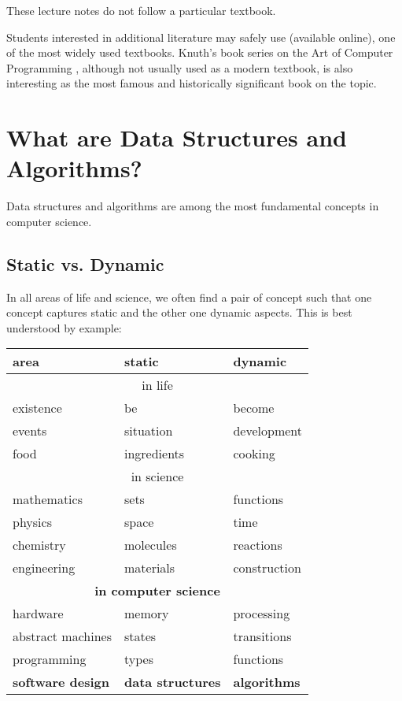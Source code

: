 These lecture notes do not follow a particular textbook.

Students interested in additional literature may safely use \cite{cormen_algorithms} (available online), one of the most widely used textbooks.
Knuth's book series on the Art of Computer Programming \cite{knuth_art}, although not usually used as a modern textbook, is also interesting as the most famous and historically significant book on the topic.

\section{What are Data Structures and Algorithms?}\label{sec:ad:whatare}

Data structures and algorithms are among the most fundamental concepts in computer science.

\subsection{Static vs. Dynamic}\label{sec:ad:static}

In all areas of life and science, we often find a pair of concept such that one concept captures static and the other one dynamic aspects.
This is best understood by example:

\begin{center}
\begin{tabular}{|l||l|l|}
\hline
area & static & dynamic \\
\hline
\hline
\multicolumn{3}{|c|}{in life}\\
\hline
existence & be & become \\
\hline
events & situation & development \\
\hline
food & ingredients & cooking \\
\hline
\hline
\multicolumn{3}{|c|}{in science}\\
\hline
mathematics & sets & functions \\
\hline
physics & space & time \\
\hline
chemistry & molecules & reactions \\
\hline
engineering & materials & construction \\
\hline
\hline
\multicolumn{3}{|c|}{\textbf{in computer science}}\\
\hline
hardware & memory & processing \\
\hline
abstract machines & states & transitions \\
\hline
programming  & types & functions \\
\hline
\textbf{software design} & \textbf{data structures} & \textbf{algorithms} \\
\hline
\end{tabular}
\end{center}

